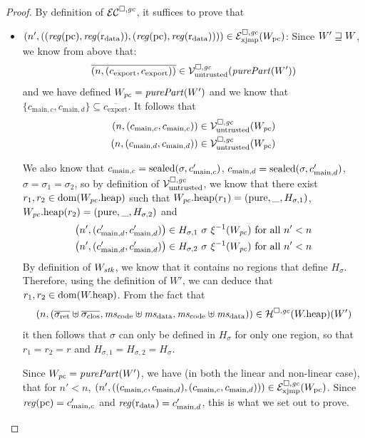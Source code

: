 \documentclass[a4paper]{article}
\begin{document}
\begin{proof}
  By definition of $\lrec$, it suffices to prove that 
  \begin{itemize}
  \item 
    $\npair[n']{( (\reg(\pcreg),\reg(\rdata)), (\reg(\pcreg),\reg(\rdata)) )} \in \lrexj(W_\pcreg)$:
    Since $W' \future W$, we know from above that:
    \begin{equation*}
      \overline{\npair{(c_{\mathrm{export}},c_{\mathrm{export}})}} \in \lrv(\purePart{W'})
    \end{equation*}
    and we have defined $W_\pc = \purePart{W'}$ and we know that $\{c_{\mathrm{main},c}, c_{\mathrm{main},d}\}\subseteq
    \overline{c_{\mathrm{export}}}$.
    It follows that 
    \begin{align*}
      \npair{(c_{\mathrm{main},c},c_{\mathrm{main},c})} &\in \lrv(W_\pc)\\
      \npair{(c_{\mathrm{main},d},c_{\mathrm{main},d})} &\in \lrv(W_\pc)
    \end{align*}

    We also know that $c_{\mathrm{main},c} = \sealed{\sigma, c_{\mathrm{main},c}'}$, $c_{\mathrm{main},d} = \sealed{\sigma, c_{\mathrm{main},d}'}$, $\sigma=\sigma_1 = \sigma_2$, so by definition of $\lrv$, we know that there exist $r_1,r_2 \in \dom(\pwheap[W_\pc])$ such that $\pwheap[W_\pc](r_1) = (\pure,\_,H_{\sigma,1})$, $\pwheap[W_\pc](r_2) = (\pure,\_,H_{\sigma,2})$ and
    \begin{align*}
      \npair[n']{(c_{\mathrm{main},d}',c_{\mathrm{main},d}')} &\in H_{\sigma,1}~ \sigma~ \xi^{-1}(W_\pc) \text{ for all } n' < n\\
      \npair[n']{(c_{\mathrm{main},d}',c_{\mathrm{main},d}')} &\in H_{\sigma,2}~ \sigma~ \xi^{-1}(W_\pc) \text{ for all } n' < n
    \end{align*}
    By definition of $W_\stk$, we know that it contains no regions that define $H_\sigma$.
    Therefore, using the definition of $W'$, we can deduce that $r_1,r_2 \in \dom(\pwheap)$.
    From the fact that 
    \begin{equation*}
      \npair{(\sigrets\uplus\sigcloss,\mscode\uplus \msdata, \mscode\uplus\msdata)} \in \lrheap(\pwheap)(W')
    \end{equation*}
    it then follows that $\sigma$ can only be defined in $H_\sigma$ for only one region, so that $r_1 = r_2 = r$ and $H_{\sigma,1} = H_{\sigma,2} = H_\sigma$.

    Since $W_\pc = \purePart{W'}$, we have (in both the linear and non-linear case), that for $n' < n$, $\npair[n']{( (c_{\mathrm{main},c},c_{\mathrm{main},d}), (c_{\mathrm{main},c},c_{\mathrm{main},d}) )} \in \lrexj(W_\pcreg)$.
    Since $\reg(\pcreg) = c_{\mathrm{main},c}'$ and $\reg(\rdata) = c_{\mathrm{main},d}'$, this is what we set out to prove.



\end{itemize}
\end{proof}
\end{document}
